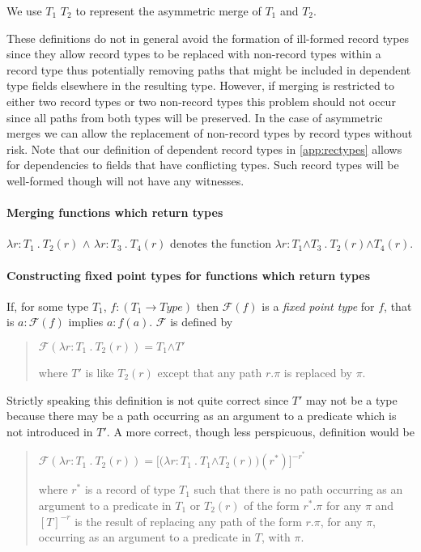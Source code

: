 We use $T_1$ \fbox{\d{$\wedge$}} $T_2$  to represent the asymmetric
merge of $T_1$ and $T_2$.  

These definitions do not in general avoid
the formation of ill-formed record types since they allow record types
to be replaced with non-record types within a record type thus
potentially removing paths that might be included in dependent type
fields elsewhere in the resulting type.  However, if merging is
restricted to either two record types or two non-record types this
problem should not occur since all paths from both types will be
preserved.  In the case of asymmetric merges we can allow the
replacement of non-record types by record types without risk.  Note
that our definition of dependent record types in \ref{app:rectypes}
allows for dependencies to fields that have conflicting types.  Such
record types will be well-formed though will not have any witnesses.

\paragraph{Merging functions which return types}

$\lambda r\!:\!T_1\ .\ T_2(r)$ \d{\d{$\wedge$}} $\lambda r\!:\!T_3\ .\ T_4(r)$
denotes the function $\lambda r\!:\!T_1$\d{$\wedge$}$T_3\ .\
T_2(r)$\d{$\wedge$}$T_4(r)$.

\paragraph{Constructing fixed point types for functions which return
  types}
\label{pg:fixedpointtype}

If, for
some type $T_1$, $f:(T_1\rightarrow\textit{Type})$ then $\mathcal{F}(f)$ is a \textit{fixed
point type} for $f$, that is $a:\mathcal{F}(f)$ implies $a:f(a)$.
$\mathcal{F}$ is defined by
\begin{quote}
$\mathcal{F}(\lambda r\!:\!T_1\ .\ T_2(r)) = T_1$\d{$\wedge$}$T'$

where $T'$ is like $T_2(r)$ except that any path $r.\pi$ is
replaced by $\pi$.
\end{quote}

Strictly speaking this definition is not quite correct since $T'$ may
not be a type because there may be a path occurring as an argument to
a predicate which is not introduced in $T'$.  A more correct, though
less perspicuous, definition would be
\begin{quote}
$\mathcal{F}(\lambda r\!:\!T_1\ .\ T_2(r)) =
[(\lambda r\!:\!T_1\ .\ T_1$\d{$\wedge$}$T_2(r))(r^*)]^{-r^*}$

where $r^*$ is a record of type $T_1$ such that there is no path occurring as an
argument to a predicate in $T_1$ or $T_2(r)$ of the form $r^*.\pi$ for
any $\pi$ and $[T]^{-r}$ is the result of replacing any path of the
form $r.\pi$, for any $\pi$, occurring as an argument to a predicate
in $T$, with $\pi$.
\end{quote}

